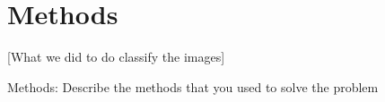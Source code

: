 \section{Methods}
[What we did to do classify the images]

Methods: Describe the methods that you used to solve the problem
